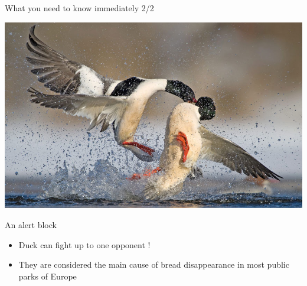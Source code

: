 \documentclass[11pt]{beamer}
\begin{document}
\begin{frame}{What you need to know immediately 2/2}
	\begin{center}
		\includegraphics[width = .5\textwidth]{duckfight.jpg}
	\end{center}
	\begin{alertblock} {An alert block}
		\begin{itemize}
			\item Duck can fight up to one opponent !
			\item They are considered  the main cause of bread disappearance in most public parks of Europe
		\end{itemize}
	\end{alertblock}
\end{frame}
\end{document}
